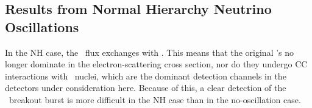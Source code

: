 \subsection{Results from Normal Hierarchy Neutrino Oscillations}
In the NH case, the \nue\ flux exchanges with \nuxpart.  This
means that the original \nue's no longer dominate in the
electron-scattering cross section, nor do they undergo CC
interactions with \ nuclei, which are the dominant detection
channels in the detectors under consideration here.  Because of this,
a clear detection of the \nue\ breakout burst is more difficult
in the NH case than in the no-oscillation case.


